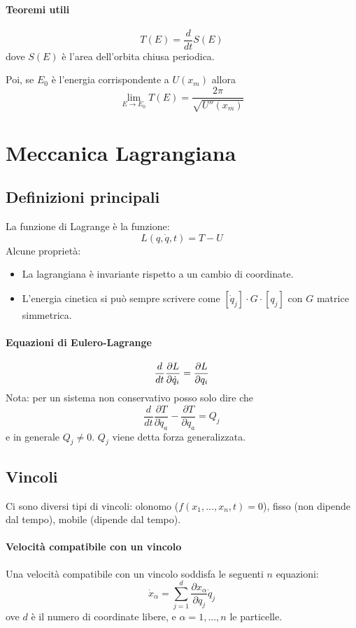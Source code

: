 \documentclass[a4paper,12pt]{article}
\begin{document}
\paragraph{Teoremi utili}
$$T(E) = \dfrac{d}{dt}S(E)$$
dove $S(E)$ è l'area dell'orbita chiusa periodica.

Poi, se $E_0$ è l'energia corrispondente a $U(x_m)$ allora $$\lim_{E\to E_0} T(E) = \dfrac{2\pi}{\sqrt{U''(x_m)}}$$


\section{Meccanica Lagrangiana}
\subsection{Definizioni principali}
La funzione di Lagrange è la funzione:
$$ L(q, \dot{q}, t) = T - U $$
Alcune proprietà:
\begin{itemize}
 \item La lagrangiana è invariante rispetto a un cambio di coordinate.
 \item L'energia cinetica si può sempre scrivere come $[\dot{q}_j]\cdot G\cdot[q_j]$ con $G$ matrice simmetrica.
\end{itemize}

\paragraph{Equazioni di Eulero-Lagrange}
$${d \over dt}\dfrac{\partial L}{\partial\dot{q}_i} = \dfrac{\partial L}{\partial q_i}$$
Nota: per un sistema non conservativo posso solo dire che
$$\frac{d}{dt}\frac{\partial T}{\partial \dot{q}_a} - \frac{\partial T}{\partial q_a} = Q_j$$
e in generale $Q_j \neq 0$. $Q_j$ viene detta forza generalizzata.
\subsection{Vincoli}
Ci sono diversi tipi di vincoli: olonomo ($f(x_1,...,x_n, t)=0$), fisso (non dipende dal tempo), mobile (dipende dal tempo).
\paragraph{Velocità compatibile con un vincolo}
Una velocità compatibile con un vincolo soddisfa le seguenti $n$ equazioni:
$$\dot{x}_\alpha = \sum_{j=1}^d \frac{\partial x_\alpha}{\partial q_j} \dot{q}_j$$
ove $d$ è il numero di coordinate libere, e $\alpha={1,...,n}$ le particelle.
\end{document}
